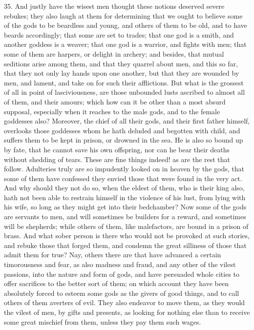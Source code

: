 35. And justly have the wisest men thought these notions deserved severe
rebukes; they also laugh at them for determining that we ought to believe
some of the gods to be beardless and young, and others of them to be old,
and to have beards accordingly; that some are set to trades; that one god
is a smith, and another goddess is a weaver; that one god is a warrior,
and fights with men; that some of them are harpers, or delight in archery;
and besides, that mutual seditions arise among them, and that they quarrel
about men, and this so far, that they not only lay hands upon one another,
but that they are wounded by men, and lament, and take on for such their
afflictions. But what is the grossest of all in point of lasciviousness,
are those unbounded lusts ascribed to almost all of them, and their
amours; which how can it be other than a most absurd supposal, especially
when it reaches to the male gods, and to the female goddesses also?
Moreover, the chief of all their gods, and their first father himself,
overlooks those goddesses whom he hath deluded and begotten with child,
and suffers them to be kept in prison, or drowned in the sea. He is also
so bound up by fate, that he cannot save his own offspring, nor can he
bear their deaths without shedding of tears. These are fine things indeed!
as are the rest that follow. Adulteries truly are so impudently looked on
in heaven by the gods, that some of them have confessed they envied those
that were found in the very act. And why should they not do so, when the
eldest of them, who is their king also, hath not been able to restrain
himself in the violence of his lust, from lying with his wife, so long as
they might get into their bedchamber? Now some of the gods are servants to
men, and will sometimes be builders for a reward, and sometimes will be
shepherds; while others of them, like malefactors, are bound in a prison
of brass. And what sober person is there who would not be provoked at such
stories, and rebuke those that forged them, and condemn the great
silliness of those that admit them for true? Nay, others there are that
have advanced a certain timorousness and fear, as also madness and fraud,
and any other of the vilest passions, into the nature and form of gods,
and have persuaded whole cities to offer sacrifices to the better sort of
them; on which account they have been absolutely forced to esteem some
gods as the givers of good things, and to call others of them averters of
evil. They also endeavor to move them, as they would the vilest of men, by
gifts and presents, as looking for nothing else than to receive some great
mischief from them, unless they pay them such wages.

